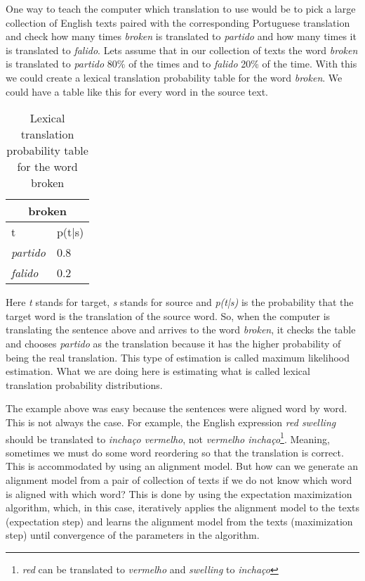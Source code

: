 One way to teach the computer which translation to use would be to pick a large collection of English texts paired with the corresponding Portuguese translation and check how many times \textit{broken} is translated to \textit{partido} and how many times it is translated to \textit{falido}. Lets assume that in our collection of texts the word \textit{broken} is translated to \textit{partido} 80\% of the times and to \textit{falido} 20\% of the time. With this we could create a lexical translation probability table for the word \textit{broken}. We could have a table like this for every word in the source text.

\begin{table}[ht]
\centering
\caption{Lexical translation probability table for the word broken}
\begin{tabular}{ll}
\multicolumn{2}{c}{\textbf{broken}} \\ \hline
t                     & p(t|s)      \\ \hline
\textit{partido}      & 0.8         \\
\textit{falido}       & 0.2         \\ \hline
\end{tabular}
\label{table:translation-prob-table}
\end{table}

Here \textit{t} stands for target, \textit{s} stands for source and \textit{p(t|s)} is the probability that the target word is the translation of the source word. So, when the computer is translating the sentence above and arrives to the word \textit{broken}, it checks the table and chooses \textit{partido} as the translation because it has the higher probability of being the real translation. This type of estimation is called maximum likelihood estimation. What we are doing here is estimating what is called lexical translation probability distributions.

The example above was easy because the sentences were aligned word by word. This is not always the case. For example, the English expression \textit{red swelling} should be translated to \textit{inchaço vermelho}, not \textit{vermelho inchaço}\footnote{\textit{red} can be translated to \textit{vermelho} and \textit{swelling} to \textit{inchaço}}. Meaning, sometimes we must do some word reordering so that the translation is correct. This is accommodated by using an alignment model. But how can we generate an alignment model from a pair of collection of texts if we do not know which word is aligned with which word? This is done by using the expectation maximization algorithm, which, in this case, iteratively applies the alignment model to the texts (expectation step) and learns the alignment model from the texts (maximization step) until convergence of the parameters in the algorithm.

